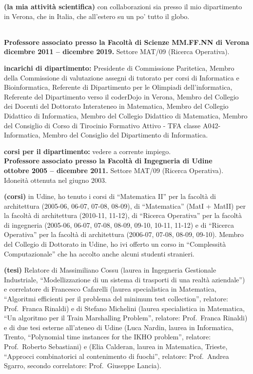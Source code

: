 \documentclass[10pt]{article}
\newcommand{\voice}[1] { \bigskip \medskip \noindent {\Large \bf #1} \medskip\\ }
\newcommand{\subvoice}[1] { {\large \bf #1} \smallskip\\ }
\begin{document}
{\bf (la mia attivit\`a scientifica)}
con collaborazioni sia presso il mio dipartimento in Verona, che in Italia, che all'estero su un po' tutto il globo.


\vspace{1.8mm}

\voice{{\LARGE Esperienze di lavoro}}

\subvoice{Professore associato presso la
          Facolt\`a di Scienze MM.FF.NN di Verona}
{\bf dicembre 2011 -- dicembre 2019.}
Settore MAT/09 (Ricerca Operativa).

{\bf incarichi di dipartimento:} Presidente di Commissione Paritetica, Membro della Commissione di valutazione assegni di tutorato per corsi di Informatica e Bioinformatica, Referente di Dipartimento per le Olimpiadi dell'informatica, Referente del Dipartimento verso il coderDojo in Verona, Membro del Collegio dei Docenti del Dottorato Interateneo in Matematica, Membro del Collegio Didattico di Informatica, Membro del Collegio Didattico di Matematica, Membro del Consiglio di Corso di Tirocinio Formativo Attivo - TFA classe A042- Informatica, Membro del Consiglio del Dipartimento di Informatica.

{\bf corsi per il dipartimento:} vedere a corrente impiego.\\

\subvoice{Professore associato presso la
          Facolt\`a di Ingegneria di Udine}
{\bf ottobre 2005 -- dicembre 2011.}
Settore MAT/09 (Ricerca Operativa).
Idoneit\`a ottenuta nel giugno 2003.

{\bf (corsi)} in Udine,
ho tenuto i corsi di ``Matematica II''
per la facolt\`a di architettura
(2005-06, 06-07, 07-08, 08-09),
di ``Matematica'' (MatI + MatII)
per la facolt\`a di architettura (2010-11, 11-12),
di ``Ricerca Operativa''
per la facolt\`a di ingegneria
(2005-06, 06-07, 07-08, 08-09, 09-10, 10-11, 11-12)
e di ``Ricerca Operativa''
per la facolt\`a di architettura
(2006-07, 07-08, 08-09, 09-10).
Membro del Collegio di Dottorato in Udine,
ho ivi offerto un corso in ``Complessit\`a Computazionale''
che ha accolto anche alcuni studenti stranieri.

{\bf (tesi)} Relatore di Massimiliano Cossu
(laurea in Ingegneria Gestionale Industriale,
``Modellizzazione di un sistema di trasporti di una realt\`a aziendale'')
e correlatore di Francesco Cafarelli
(laurea specialistica in Matematica,
``Algoritmi efficienti per il problema del minimum test collection'',
relatore: Prof.~Franca Rinaldi)
e di Stefano Michelini (laurea specialistica in Matematica, ``Un algoritmo per il Train Marshalling Problem'', relatore: Prof.~Franca Rinaldi) %
e di due tesi esterne all'ateneo di Udine
(Luca Nardin, laurea in Informatica, Trento,%
``Polynomial time instances for the IKHO problem'',
relatore: Prof.~Roberto Sebastiani)
e (Elia Calderan, laurea in Matematica, Trieste,%
``Approcci combinatorici al contenimento di fuochi'',
relatore: Prof.~Andrea Sgarro,
secondo correlatore: Prof.~Giuseppe Lancia).
\end{document}
